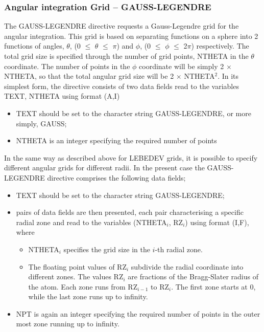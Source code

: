 \documentclass[11pt,fleqn]{article}
\begin{document}
\subsubsection{Angular integration Grid -- GAUSS-LEGENDRE}

The GAUSS-LEGENDRE directive requests a Gauss-Legendre grid for the
angular integration. This grid is based on separating functions on a
sphere into 2 functions of angles, $\theta$, (0 $\leq$ $\theta$ $\leq$
$\pi$) and $\phi$,  (0 $\leq$ $\phi$ $\leq$ 2$\pi$) respectively.  The
total grid size is specified through the number of grid points, NTHETA
in the $\theta$ coordinate.  The number of points in the $\phi$
coordinate will be simply 2 $\times$ NTHETA, so that the total angular
grid size will be 2 $\times$ NTHETA$^2$.  In its simplest form, the
directive consists of two data fields read to the variables TEXT, NTHETA
using format (A,I)
\begin{itemize}
\item TEXT should be set to the character string GAUSS-LEGENDRE, or
more simply, GAUSS;
\item NTHETA is an integer specifying the required number of points
\end{itemize}
In the same way as described above for LEBEDEV grids, it is possible
to specify different angular grids for different radii. In the 
present case the GAUSS-LEGENDRE directive comprises the following data fields;
\begin{itemize}
\item TEXT should be set to the character string GAUSS-LEGENDRE;
\item pairs of data fields are then presented, each pair characterising a
specific radial zone and read to the variables (NTHETA$_i$, RZ$_i$) using format (I,F), where
\begin{itemize}
\item NTHETA$_i$ specifies the grid size in the $i$-th radial zone.
\item The floating point values of RZ$_i$ subdivide the radial coordinate
into different zones. The values RZ$_i$ are fractions of the
Bragg-Slater radius \cite{slater64} of the atom. Each zone runs from
RZ$_{i-1}$ to RZ$_i$. The first zone starts at 0, while the last zone runs up 
to infinity.
\end{itemize}
\item NPT is again an integer specifying the required number of points 
      in the outer most zone running up to infinity.
\end{itemize}
\end{document}
